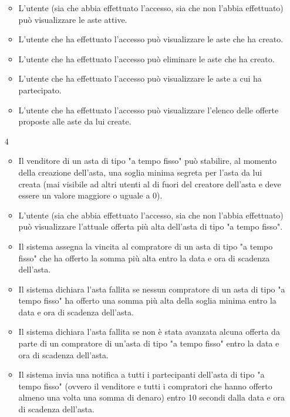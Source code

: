 \begin{itemize}
\begin{itemize}
                    \item L'utente (sia che abbia effettuato l'accesso, sia che non l'abbia effettuato) può visualizzare le aste attive.
                    \item L'utente che ha effettuato l'accesso può visualizzare le aste che ha creato.
                    \item L'utente che ha effettuato l'accesso può eliminare le aste che ha creato.
                    \item L'utente che ha effettuato l'accesso può visualizzare le aste a cui ha partecipato.
                    \item L'utente che ha effettuato l'accesso può visualizzare l'elenco delle offerte proposte alle aste da lui create.
                \end{itemize}
            \item[4]
                \begin{itemize}
                    \item Il venditore di un asta di tipo "a tempo fisso" può stabilire, al momento della creazione dell'asta, una soglia minima segreta per l'asta da lui creata (mai visibile ad altri utenti al di fuori del creatore dell'asta e deve essere un valore maggiore o uguale a 0).
                    \item L'utente (sia che abbia effettuato l'accesso, sia che non l'abbia effettuato) può visualizzare l'attuale offerta più alta dell'asta di tipo "a tempo fisso".
                    \item Il sistema assegna la vincita al compratore di un asta di tipo "a tempo fisso" che ha offerto la somma più alta entro la data e ora di scadenza dell'asta.
                    \item Il sistema dichiara l'asta fallita se nessun compratore di un asta di tipo "a tempo fisso" ha offerto una somma più alta della soglia minima entro la data e ora di scadenza dell'asta.
                    \item Il sistema dichiara l'asta fallita se non è stata avanzata alcuna offerta da parte di un compratore di un'asta di tipo "a tempo fisso" entro la data e ora di scadenza dell'asta.
                    \item Il sistema invia una notifica a tutti i partecipanti dell'asta di tipo "a tempo fisso" (ovvero il venditore e tutti i compratori che hanno offerto almeno una volta una somma di denaro) entro 10 secondi dalla data e ora di scadenza dell'asta.
                \end{itemize}

\end{itemize}

